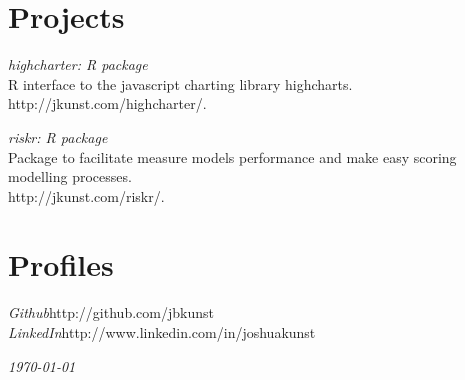 \documentclass[margin]{res}
\begin{document}
\begin{resume}
\vspace{1cm}

\newpage

\section{Projects}


    {\sl highcharter: R package}\\
    R interface to the javascript charting library highcharts.\\
    http://jkunst.com/highcharter/.
    
    {\sl riskr: R package}\\
    Package to facilitate measure models performance and make easy scoring modelling processes.\\
    http://jkunst.com/riskr/.
    

\vspace{1cm}

\section{Profiles}
    
    {\sl Github}\hfill http://github.com/jbkunst\\
    
    {\sl LinkedIn}\hfill http://www.linkedin.com/in/joshuakunst

\vspace{1cm}


\end{resume}

\vspace{0.5cm}

\hfill {\sl \today}
\end{document}
